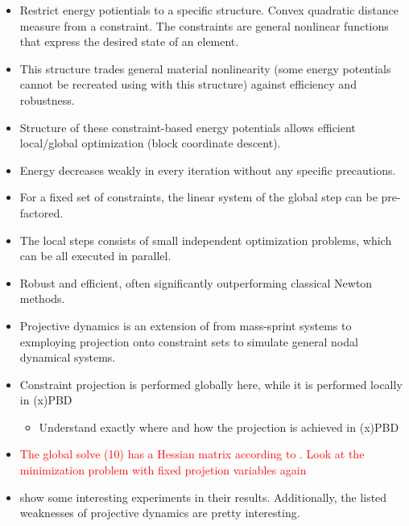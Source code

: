 \documentclass{article}
\begin{document}
\begin{itemize}
    \item Restrict energy potientials to a specific structure. Convex quadratic distance measure from a constraint. The constraints are general
        nonlinear functions that express the desired state of an element.
    \item This structure trades general material nonlinearity (some energy potentials cannot be recreated using with this structure) against 
        efficiency and robustness.
    \item Structure of these constraint-based energy potentials allows efficient local/global optimization (block coordinate descent).
    \item Energy decreases weakly in every iteration without any specific precautions.
    \item For a fixed set of constraints, the linear system of the global step can be pre-factored.
    \item The local steps consists of small independent optimization problems, which can be all executed in parallel.
    \item Robust and efficient, often significantly outperforming classical Newton methods.
    \item Projective dynamics is an extension of \cite{liu2013} from mass-sprint systems to exmploying projection onto constraint sets to 
        simulate general nodal dynamical systems.
    \item Constraint projection is performed globally here, while it is performed locally in (x)PBD
        \begin{itemize}
            \item Understand exactly where and how the projection is achieved in (x)PBD
        \end{itemize}

    \item \textcolor{red}{The global solve (10) has a Hessian matrix according to \cite{bouaziz2014}. Look at the minimization problem with
        fixed projetion variables again }

    \item \cite{bouaziz2014} show some interesting experiments in their results. Additionally, the listed weaknesses of projective dynamics are 
        pretty interesting.
\end{itemize}




\end{document}
